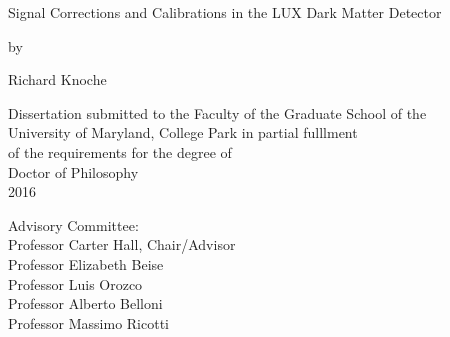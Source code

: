 \begin{titlepage}
    \begin{center}
        \vspace*{1cm}
        
        \LARGE
        Signal Corrections and Calibrations in the LUX Dark Matter Detector
        
        \vspace{1.5cm}
		by
		
		\vspace{0.5cm}        
        
        Richard Knoche
        
        \vfill
        
        \normalsize
        Dissertation submitted to the Faculty of the Graduate School of the \\
		University of Maryland, College Park in partial fulllment \\
		of the requirements for the degree of \\
		Doctor of Philosophy \\
		2016

    \end{center}

\vfill
\noindent    
Advisory Committee: \\
Professor Carter Hall, Chair/Advisor \\
Professor Elizabeth Beise \\
Professor Luis Orozco \\
Professor Alberto Belloni \\
Professor Massimo Ricotti \\
\clearpage

\end{titlepage}